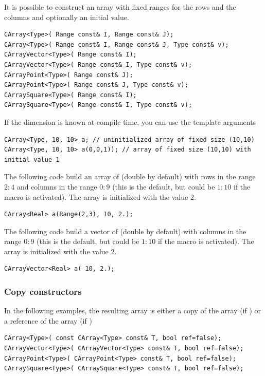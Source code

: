 \documentclass[a4paper,10pt]{article}
\begin{document}
It is possible to construct an array with fixed ranges for the rows and the columns and
optionally an initial value.
\begin{lstlisting}[style=customcpp]
CArray<Type>( Range const& I, Range const& J);
CArray<Type>( Range const& I, Range const& J, Type const& v);
CArrayVector<Type>( Range const& I);
CArrayVector<Type>( Range const& I, Type const& v);
CArrayPoint<Type>( Range const& J);
CArrayPoint<Type>( Range const& J, Type const& v);
CArraySquare<Type>( Range const& I);
CArraySquare<Type>( Range const& I, Type const& v);
\end{lstlisting}
If the dimension is known at compile time, you can use the template arguments
\begin{lstlisting}[style=customcpp]
CArray<Type, 10, 10> a; // uninitialized array of fixed size (10,10)
CArray<Type, 10, 10> a(0,0,1)); // array of fixed size (10,10) with initial value 1
\end{lstlisting}
The following code build an array of  (double by default) with rows in
the range $2:4$ and columns in the range $0:9$ (this is the default, but could be
$1:10$ if the macro  is activated). The array is initialized with
the value $2$.
\begin{lstlisting}[style=customcpp]
CArray<Real> a(Range(2,3), 10, 2.);
\end{lstlisting}
The following code build a vector of  (double by default) with columns
in the range $0:9$ (this is the default, but could be $1:10$ if the macro 
is activated). The array is initialized with the value $2$.
\begin{lstlisting}[style=customcpp]
CArrayVector<Real> a( 10, 2.);
\end{lstlisting}

\subsubsection{Copy constructors}

In the following examples, the resulting array is either a copy of the array  (if )
or a reference of the array   (if )
\begin{lstlisting}[style=customcpp]
CArray<Type>( const CArray<Type> const& T, bool ref=false);
CArrayVector<Type>( CArrayVector<Type> const& T, bool ref=false);
CArrayPoint<Type>( CArrayPoint<Type> const& T, bool ref=false);
CArraySquare<Type>( CArraySquare<Type> const& T, bool ref=false);
\end{lstlisting}
\end{document}
